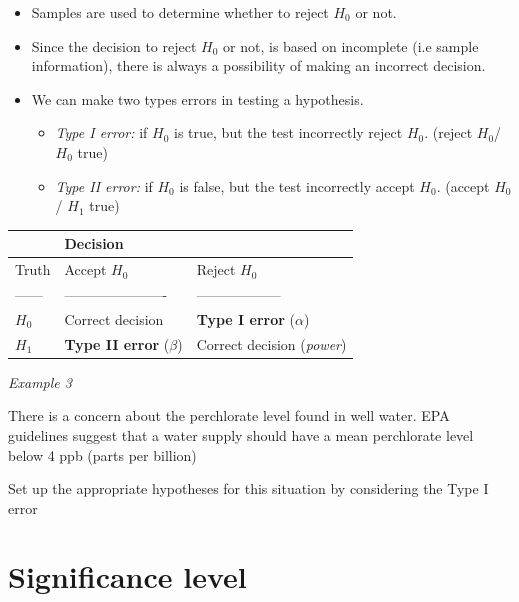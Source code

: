 \documentclass[]{book}
\providecommand{\tightlist}{%
  \setlength{\itemsep}{0pt}\setlength{\parskip}{0pt}}
\begin{document}
\begin{itemize}
\item
  Samples are used to determine whether to reject \(H_0\) or not.
\item
  Since the decision to reject \(H_0\) or not, is based on incomplete (i.e sample information), there is always a possibility of making an incorrect decision.
\item
  We can make two types errors in testing a hypothesis.

  \begin{itemize}
  \tightlist
  \item
    \emph{Type I error:} if \(H_0\) is true, but the test incorrectly reject \(H_0.\) (reject \(H_0\)/ \(H_0\) true)
  \item
    \emph{Type II error:} if \(H_0\) is false, but the test incorrectly accept \(H_0.\) (accept \(H_0\)/ \(H_1\) true)
  \end{itemize}
\end{itemize}

\begin{longtable}[]{@{}lll@{}}
\toprule
\(\text{}\) & Decision &\tabularnewline
\midrule
\endhead
Truth & Accept \(H_0\) & Reject \(H_0\)\tabularnewline
------ & ---------------------- & ------------------\tabularnewline
\(H_0\) & Correct decision & \textbf{Type I error} (\(\alpha\))\tabularnewline
\(H_1\) & \textbf{Type II error} (\(\beta\)) & Correct decision (\emph{power})\tabularnewline
\bottomrule
\end{longtable}

\emph{Example 3}

There is a concern about the perchlorate level found in well water. EPA guidelines suggest that a water supply should have a mean perchlorate level below 4 ppb (parts per billion)

Set up the appropriate hypotheses for this situation by considering the Type I error

\newpage

\hypertarget{significance-level}{%
\section{Significance level}\label{significance-level}}
\end{document}
